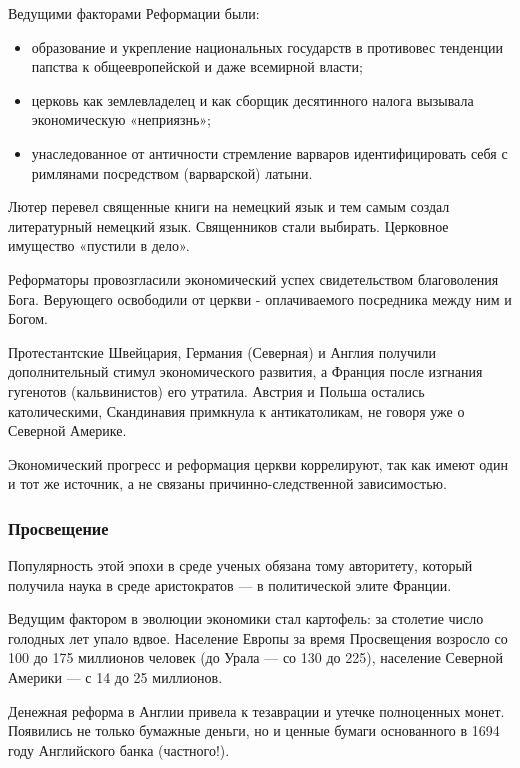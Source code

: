 Ведущими факторами Реформации были:

\begin{itemize}
\item 
образование и укрепление национальных государств в противовес тенденции папства к общеевропейской и даже всемирной
власти;
\item церковь как землевладелец и как сборщик десятинного налога вызывала экономическую «неприязнь»;
\item 
унаследованное от античности стремление варваров идентифицировать себя с римлянами посредством (варварской) латыни.
\end{itemize}

Лютер перевел священные книги на немецкий язык и тем самым создал литературный немецкий язык. Священников стали
выбирать. Церковное имущество «пустили в дело».


Реформаторы провозгласили экономический успех свидетельством благоволения Бога. Верующего освободили от церкви - оплачиваемого посредника между ним и Богом.


Протестантские Швейцария, Германия (Северная) и Англия получили дополнительный стимул экономического развития, а Франция
после изгнания гугенотов (кальвинистов) его утратила. Австрия и Польша остались католическими, Скандинавия примкнула к
антикатоликам, не говоря уже о Северной Америке.


Экономический прогресс и реформация церкви коррелируют, так как имеют один и тот же источник, а не связаны
причинно-следственной зависимостью.

\subsubsection[Просвещение ]{Просвещение}

Популярность этой эпохи в среде ученых обязана тому авторитету, который получила наука в среде аристократов — в
политической элите Франции.


Ведущим фактором в эволюции экономики стал картофель: за столетие число голодных лет упало вдвое. Население Европы за
время Просвещения возросло со 100 до 175 миллионов человек (до Урала — со 130 до 225), население Северной Америки — с
14 до 25 миллионов.


Денежная реформа в Англии привела к тезаврации и утечке полноценных монет. Появились не только бумажные деньги, но и
ценные бумаги основанного в 1694 году Английского банка (частного!).



